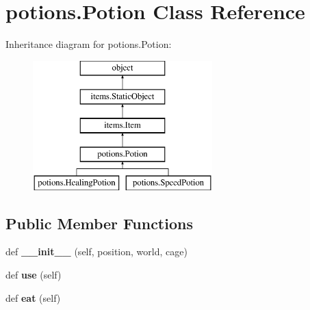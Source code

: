 \hypertarget{classpotions_1_1_potion}{}\section{potions.\+Potion Class Reference}
\label{classpotions_1_1_potion}
Inheritance diagram for potions.\+Potion\+:\begin{figure}[H]
\begin{center}
\leavevmode
\includegraphics[height=5.000000cm]{classpotions_1_1_potion}
\end{center}
\end{figure}
\subsection*{Public Member Functions}
\begin{DoxyCompactItemize}
\item 
\hypertarget{classpotions_1_1_potion_aaf05467102aba6f7954f97232468506b}{}def {\bfseries \+\_\+\+\_\+init\+\_\+\+\_\+} (self, position, world, cage)\label{classpotions_1_1_potion_aaf05467102aba6f7954f97232468506b}

\item 
\hypertarget{classpotions_1_1_potion_afaec7f50b484e87a8e2c255a8f6dc565}{}def {\bfseries use} (self)\label{classpotions_1_1_potion_afaec7f50b484e87a8e2c255a8f6dc565}

\item 
\hypertarget{classpotions_1_1_potion_a082b478492f47aef9e5624f0d0a427c6}{}def {\bfseries eat} (self)\label{classpotions_1_1_potion_a082b478492f47aef9e5624f0d0a427c6}

\end{DoxyCompactItemize}
